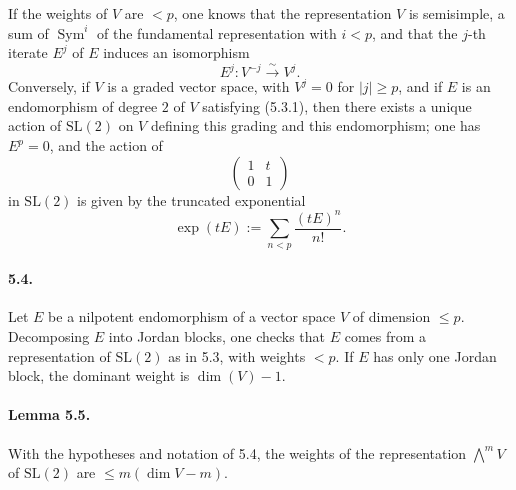 \documentclass[11pt]{article}
\newcommand{\Sym}{\operatorname{Sym}}
\newcommand{\xiso}{\xrightarrow{\sim}}
\theoremstyle{plain}
\theoremstyle{definition}
\begin{document}
If the weights of $V$ are $<p$, one knows that the representation $V$ is semisimple, a sum of $\Sym^i$ of the fundamental representation with $i<p$, and that the $j$-th iterate $E^j$ of $E$ induces an isomorphism
\begin{equation}\tag{5.3.1}
   E^j:V^{-j}\xiso{}V^j.
\end{equation}
Conversely, if $V$ is a graded vector space, with $V^j=0$ for $|j|\ge p$, and if $E$ is an endomorphism of degree $2$ of $V$ satisfying (5.3.1), then there exists a unique action of $\mathrm{SL}(2)$ on $V$ defining this grading and this endomorphism; one has $E^p=0$, and the action of
\[
   \begin{pmatrix}1&t\\0&1\end{pmatrix}
\]
in $\mathrm{SL}(2)$ is given by the truncated exponential
\begin{equation}\tag{5.3.2}
   \exp(tE):=\sum_{n<p}\frac{(tE)^n}{n!}.
\end{equation}

\paragraph{5.4.} Let $E$ be a nilpotent endomorphism of a vector space $V$ of dimension $\le p$. Decomposing $E$ into Jordan blocks, one checks that $E$ comes from a representation of $\mathrm{SL}(2)$ as in 5.3, with weights $<p$. If $E$ has only one Jordan block, the dominant weight is $\dim(V)-1$.

\paragraph{Lemma 5.5.} With the hypotheses and notation of 5.4, the weights of the representation $\bigwedge^m V$ of $\mathrm{SL}(2)$ are $\le m(\dim V-m)$.
\end{document}
